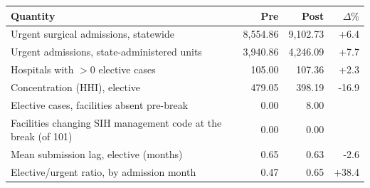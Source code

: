\small
\begin{tabular}{lrrr}
\toprule
Quantity & Pre & Post & $\Delta\%$ \\
\midrule
Urgent surgical admissions, statewide & 8,554.86 & 9,102.73 & +6.4 \\
Urgent admissions, state-administered units & 3,940.86 & 4,246.09 & +7.7 \\
Hospitals with $>0$ elective cases & 105.00 & 107.36 & +2.3 \\
Concentration (HHI), elective & 479.05 & 398.19 & -16.9 \\
Elective cases, facilities absent pre-break & 0.00 & 8.00 &  \\
Facilities changing SIH management code at the break (of 101) & 0.00 & 0.00 &  \\
Mean submission lag, elective (months) & 0.65 & 0.63 & -2.6 \\
Elective/urgent ratio, by admission month & 0.47 & 0.65 & +38.4 \\
\bottomrule
\end{tabular}
